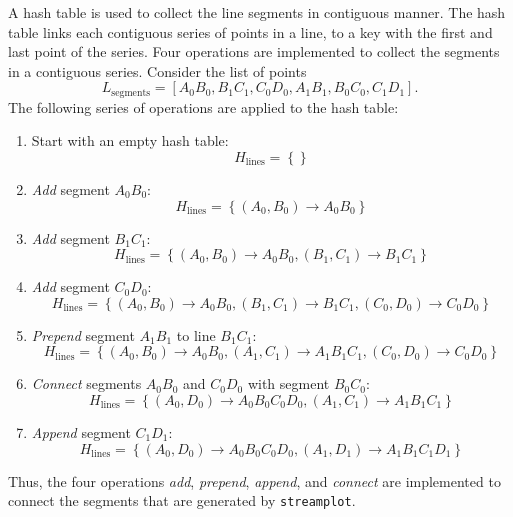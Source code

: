 \documentclass[english, a4paper]{article}
\begin{document}
A hash table is used to collect the line segments in contiguous manner. The hash table links each contiguous series of points in a line, to a key with the first and last point of the series. Four operations are implemented to collect the segments in a contiguous series. Consider the list of points
\begin{equation}
	L_{\mathrm{segments}} = \left[ A_{0}B_{0}, B_{1} C_{1}, C_{0}D_{0}, A_{1}B_{1}, B_{0}C_{0}, C_{1} D_{1} \right].
\end{equation}
The following series of operations are applied to the hash table:
\begin{enumerate}
\item Start with an empty hash table:
	\begin{equation}
		H_{\mathrm{lines}} = \left\{ \right\}
	\end{equation}
\item \emph{Add} segment $A_{0} B_{0}$:
	\begin{equation}
		H_{\mathrm{lines}} = \left\{ (A_{0}, B_{0}) \to A_{0} B_{0} \right\}
	\end{equation}
\item \emph{Add} segment $B_{1} C_{1}$:
	\begin{equation}
		H_{\mathrm{lines}} = \left\{ (A_{0}, B_{0}) \to A_{0} B_{0}, (B_{1}, C_{1}) \to B_{1} C_{1} \right\}
	\end{equation}
\item \emph{Add} segment $C_{0} D_{0}$:
	\begin{equation}
		H_{\mathrm{lines}} = \left\{ (A_{0}, B_{0}) \to A_{0} B_{0}, (B_{1}, C_{1}) \to B_{1} C_{1}, (C_{0}, D_{0}) \to C_{0} D_{0} \right\}
	\end{equation}
\item \emph{Prepend} segment $A_{1} B_{1}$ to line $B_{1} C_{1}$:
	\begin{equation}
		H_{\mathrm{lines}} = \left\{ (A_{0}, B_{0}) \to A_{0} B_{0}, (A_{1}, C_{1}) \to A_{1} B_{1} C_{1}, (C_{0}, D_{0}) \to C_{0} D_{0} \right\}
	\end{equation}
\item \emph{Connect} segments $A_{0} B_{0}$ and $C_{0} D_{0}$ with segment $B_{0} C_{0}$:
	\begin{equation}
		H_{\mathrm{lines}} = \left\{ (A_{0}, D_{0}) \to A_{0} B_{0} C_{0} D_{0}, (A_{1}, C_{1}) \to A_{1} B_{1} C_{1} \right\}
	\end{equation}
\item \emph{Append} segment $C_{1} D_{1}$:
	\begin{equation}
		H_{\mathrm{lines}} = \left\{ (A_{0}, D_{0}) \to A_{0} B_{0} C_{0} D_{0}, (A_{1}, D_{1}) \to A_{1} B_{1} C_{1} D_{1} \right\}
	\end{equation}
\end{enumerate}
Thus, the four operations \emph{add}, \emph{prepend}, \emph{append}, and \emph{connect} are implemented to connect the segments that are generated by \texttt{streamplot}.
\end{document}
